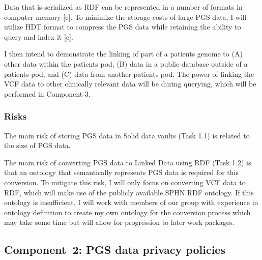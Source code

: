 \documentclass[a4paper,11pt]{article}
\begin{document}
\begin{refsection}
Data that is serialized as RDF can be represented in a number of formats in computer memory [c].
To minimize the storage costs of large PGS data, I will utilize HDT format to compress the PGS data while retaining the ability to query and index it [c].

I then intend to demonstrate the linking of part of a patient\textquotesingle s genome to
(A) other data within the patient\textquotesingle s pod, 
(B) data in a public database outside of a patient\textquotesingle s pod, and
(C) data from another patient\textquotesingle s pod.
The power of linking the VCF data to other clinically relevant data will be during querying, which will be performed in Component 3.




\subsubsection{Risks}
The main risk of storing PGS data in Solid data vaults (Task 1.1)
is related to the size of PGS data. 

The main risk of converting PGS data to Linked Data using RDF (Task 1.2)
is that an ontology that semantically represents PGS data is required for this conversion. 
To mitigate this risk, I will only focus on converting VCF data to RDF, which will make use of the publicly available SPHN RDF ontology.
If this ontology is insufficient, I will work with members of our group with experience in ontology definition to create my own ontology for the conversion process which may take some time but will allow for progression to later work packages.


\newcommand\WPb{PGS data privacy policies}
\subsection{Component~2: \WPb}



\newcommand\WPba{Granular, flexible data policies}

\end{refsection}
\end{document}

